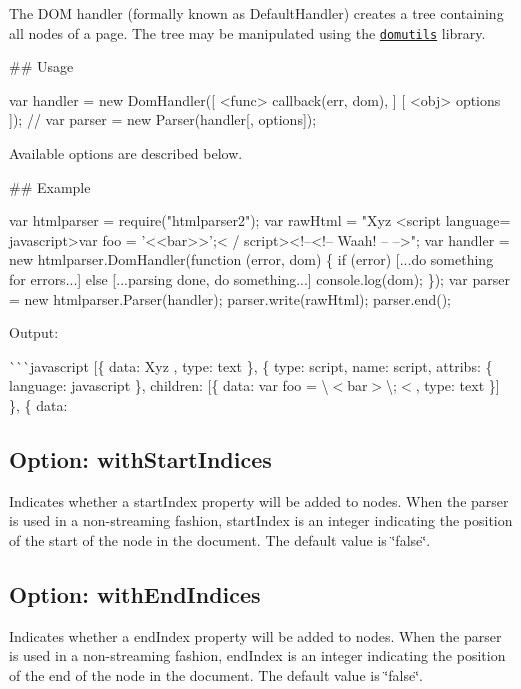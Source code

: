 The D\+OM handler (formally known as Default\+Handler) creates a tree containing all nodes of a page. The tree may be manipulated using the \href{https://github.com/fb55/domutils}{\tt domutils} library.

\#\# Usage 
\begin{DoxyCode}
var handler = new DomHandler([ <func> callback(err, dom), ] [ <obj> options ]);
// var parser = new Parser(handler[, options]);
\end{DoxyCode}


Available options are described below.

\#\# Example 
\begin{DoxyCode}
var htmlparser = require("htmlparser2");
var rawHtml = "Xyz <script language= javascript>var foo = '<<bar>>';< /  script><!--<!-- Waah! -- -->";
var handler = new htmlparser.DomHandler(function (error, dom) \{
    if (error)
      [...do something for errors...]
    else
      [...parsing done, do something...]
        console.log(dom);
\});
var parser = new htmlparser.Parser(handler);
parser.write(rawHtml);
parser.end();
\end{DoxyCode}


Output\+:

\`{}\`{}\`{}javascript \mbox{[}\{ data\+: \textquotesingle{}Xyz \textquotesingle{}, type\+: \textquotesingle{}text\textquotesingle{} \}, \{ type\+: \textquotesingle{}script\textquotesingle{}, name\+: \textquotesingle{}script\textquotesingle{}, attribs\+: \{ language\+: \textquotesingle{}javascript\textquotesingle{} \}, children\+: \mbox{[}\{ data\+: \textquotesingle{}var foo = \textbackslash{}\textquotesingle{}$<$bar$>$\textbackslash{}\textquotesingle{};$<$\textquotesingle{}, type\+: \textquotesingle{}text\textquotesingle{} \}\mbox{]} \}, \{ data\+: \textquotesingle{}

\subsection*{Option\+: with\+Start\+Indices}

Indicates whether a {\ttfamily start\+Index} property will be added to nodes. When the parser is used in a non-\/streaming fashion, {\ttfamily start\+Index} is an integer indicating the position of the start of the node in the document. The default value is \char`\"{}false\char`\"{}.

\subsection*{Option\+: with\+End\+Indices}

Indicates whether a {\ttfamily end\+Index} property will be added to nodes. When the parser is used in a non-\/streaming fashion, {\ttfamily end\+Index} is an integer indicating the position of the end of the node in the document. The default value is \char`\"{}false\char`\"{}. 